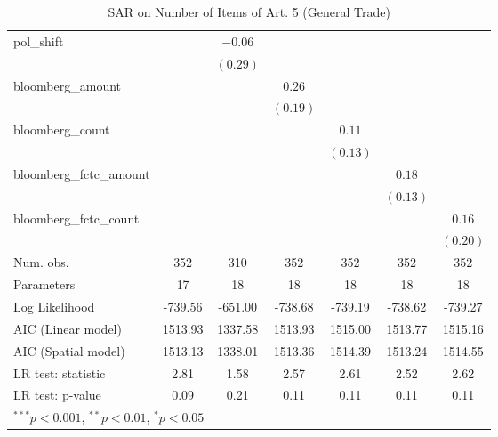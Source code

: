 \begin{table}[!h]
\begin{center}
\begin{tabular}{l c c c c c c }
pol\_shift              &              & $-0.06$      &              &              &              &              \\
                        &              & $(0.29)$     &              &              &              &              \\
bloomberg\_amount       &              &              & $0.26$       &              &              &              \\
                        &              &              & $(0.19)$     &              &              &              \\
bloomberg\_count        &              &              &              & $0.11$       &              &              \\
                        &              &              &              & $(0.13)$     &              &              \\
bloomberg\_fctc\_amount &              &              &              &              & $0.18$       &              \\
                        &              &              &              &              & $(0.13)$     &              \\
bloomberg\_fctc\_count  &              &              &              &              &              & $0.16$       \\
                        &              &              &              &              &              & $(0.20)$     \\
\midrule
Num. obs.               & 352          & 310          & 352          & 352          & 352          & 352          \\
Parameters              & 17           & 18           & 18           & 18           & 18           & 18           \\
Log Likelihood          & -739.56      & -651.00      & -738.68      & -739.19      & -738.62      & -739.27      \\
AIC (Linear model)      & 1513.93      & 1337.58      & 1513.93      & 1515.00      & 1513.77      & 1515.16      \\
AIC (Spatial model)     & 1513.13      & 1338.01      & 1513.36      & 1514.39      & 1513.24      & 1514.55      \\
LR test: statistic      & 2.81         & 1.58         & 2.57         & 2.61         & 2.52         & 2.62         \\
LR test: p-value        & 0.09         & 0.21         & 0.11         & 0.11         & 0.11         & 0.11         \\
\bottomrule
\multicolumn{7}{l}{\scriptsize{$^{***}p<0.001$, $^{**}p<0.01$, $^*p<0.05$}}
\end{tabular}
\caption{SAR on Number of Items of Art. 5 (General Trade)}
\label{table:coefficients}
\end{center}
\end{table}
